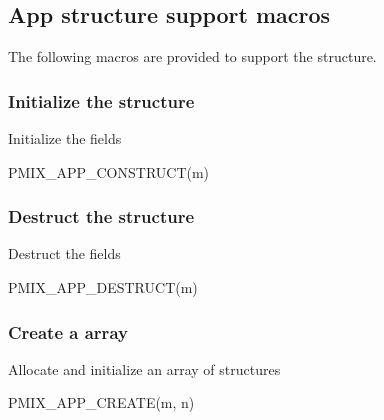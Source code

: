 \subsection{App structure support macros}
The following macros are provided to support the  structure.

\subsubsection{Initialize the  structure}

Initialize the  fields

\cspecificstart
\begin{codepar}
PMIX_APP_CONSTRUCT(m)
\end{codepar}
\cspecificend

\begin{arglist}
\end{arglist}

\subsubsection{Destruct the  structure}

Destruct the  fields

\cspecificstart
\begin{codepar}
PMIX_APP_DESTRUCT(m)
\end{codepar}
\cspecificend

\begin{arglist}
\end{arglist}

\subsubsection{Create a  array}

Allocate and initialize an array of  structures

\cspecificstart
\begin{codepar}
PMIX_APP_CREATE(m, n)
\end{codepar}
\cspecificend


